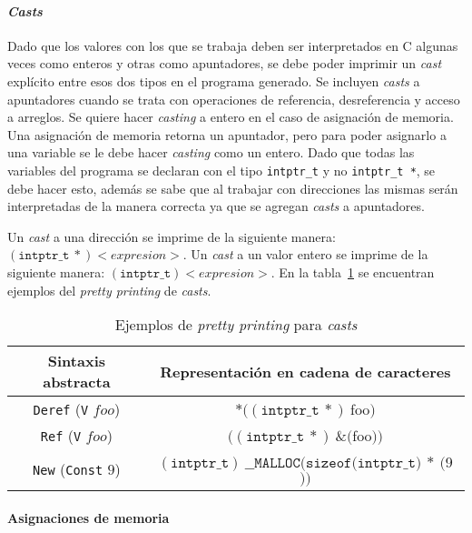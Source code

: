 \paragraph*{\textit{Casts}}
Dado que los valores con los que se trabaja deben ser interpretados en C algunas veces como enteros y otras como apuntadores, se debe poder imprimir un \textit{cast} explícito entre esos dos tipos en el programa generado.
Se incluyen \textit{casts} a apuntadores cuando se trata con operaciones de referencia, desreferencia y acceso a arreglos.
Se quiere hacer \textit{casting} a entero en el caso de asignación de memoria.
Una asignación de memoria retorna un apuntador, pero para poder asignarlo a una variable se le debe hacer \textit{casting} como un entero.
Dado que todas las variables del programa se declaran con el tipo \verb|intptr_t| y no \verb|intptr_t *|, se debe hacer esto, además se sabe que al trabajar con direcciones las mismas serán interpretadas de la manera correcta ya que se agregan \textit{casts} a apuntadores.


Un \textit{cast} a una dirección se imprime de la siguiente manera: $(\mathtt{intptr\_t}\ *) <expresion>$.
Un \textit{cast} a un valor entero se imprime de la siguiente manera: $(\mathtt{intptr\_t}) <expresion>$.
En la tabla~\ref{tab:pretty_casts} se encuentran ejemplos del \textit{pretty printing} de \textit{casts}.

\begin{table}[h!]
\centering
\begin{tabular}{|c|c|}
  \hline
  \textbf{Sintaxis abstracta} & \textbf{Representación en cadena de caracteres} \\ [0.5ex]
  \hline \hline
  \verb|Deref| (\verb|V| $foo$) & $*((\mathtt{intptr\_t}\ *)\ $foo$)$ \\
  \verb|Ref| (\verb|V| $foo$)   & $((\mathtt{intptr\_t}\ *)\ \&($foo$))$ \\
  \verb|New| (\verb|Const| $9$) & $(\mathtt{intptr\_t})\ \mathtt{\_\_MALLOC}(\mathtt{sizeof}(\mathtt{intptr\_t)}\ *\ ($9$))$ \\
  \hline
\end{tabular}

\caption{Ejemplos de \textit{pretty printing} para \textit{casts}}
\label{tab:pretty_casts}
\end{table}


\paragraph*{Asignaciones de memoria}


